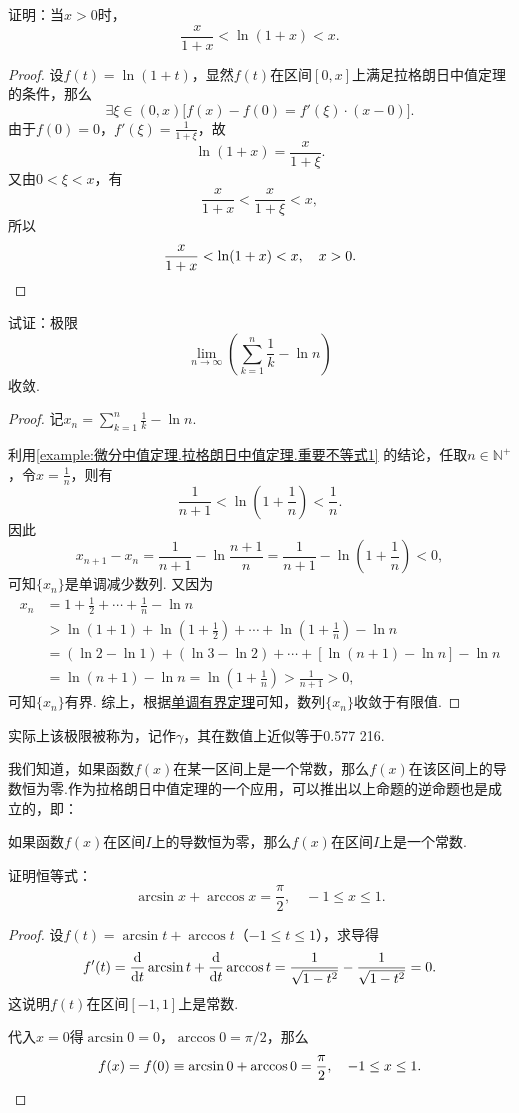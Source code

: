\begin{example}\label{example:微分中值定理.拉格朗日中值定理.重要不等式1}
证明：当\(x>0\)时，\[
\frac{x}{1+x} < \ln(1+x) < x.
\]
\begin{proof}
设\(f(t) = \ln(1+t)\)，显然\(f(t)\)在区间\([0,x]\)上满足拉格朗日中值定理的条件，那么\[
\exists \xi\in(0,x) \bigl[
	f(x)-f(0)=f'(\xi)\cdot(x-0)
\bigr].
\]由于\(f(0)=0\)，\(f'(\xi)=\frac{1}{1+\xi}\)，故\[
\ln(1+x) = \frac{x}{1+\xi}.
\]又由\(0<\xi<x\)，有\[
\frac{x}{1+x}<\frac{x}{1+\xi}<x,
\]所以\[
\frac{x}{1+x}<\ln(1+x)<x, \quad x > 0.
\qedhere
\]
\end{proof}
\end{example}

\begin{example}
试证：极限\[
\lim\limits_{n\to\infty} \left(\sum\limits_{k=1}^n \frac{1}{k} - \ln n\right)
\]收敛.
\begin{proof}
记\(x_n = \sum\limits_{k=1}^n \frac{1}{k} - \ln n\).

利用\cref{example:微分中值定理.拉格朗日中值定理.重要不等式1} 的结论，任取\(n\in\mathbb{N}^+\)，令\(x=\frac{1}{n}\)，则有\[
\frac{1}{n+1} < \ln(1+\frac{1}{n}) < \frac{1}{n}.
\]因此\[
x_{n+1} - x_n = \frac{1}{n+1} - \ln\frac{n+1}{n}
= \frac{1}{n+1} - \ln(1+\frac{1}{n}) < 0,
\]可知\(\{x_n\}\)是单调减少数列.
又因为\begin{align*}
x_n &= 1 + \frac{1}{2} + \dotsb + \frac{1}{n} - \ln n \\
&> \ln(1+1) + \ln(1+\frac{1}{2}) + \dotsb + \ln(1+\frac{1}{n}) - \ln n \\
&= (\ln2-\ln1)+(\ln3-\ln2)+\dotsb+[\ln(n+1)-\ln n] - \ln n \\
&= \ln(n+1) - \ln n
= \ln(1+\frac{1}{n})
> \frac{1}{n+1} > 0,
\end{align*}
可知\(\{x_n\}\)有界.
综上，根据\hyperref[theorem:极限.函数的单调有界定理]{单调有界定理}可知，数列\(\{x_n\}\)收敛于有限值.
\end{proof}
实际上该极限被称为，记作\(\gamma\)，其在数值上近似等于0.577 216.
\end{example}

我们知道，如果函数\(f(x)\)在某一区间上是一个常数，那么\(f(x)\)在该区间上的导数恒为零.作为拉格朗日中值定理的一个应用，可以推出以上命题的逆命题也是成立的，即：
\begin{theorem}
如果函数\(f(x)\)在区间\(I\)上的导数恒为零，那么\(f(x)\)在区间\(I\)上是一个常数.
\end{theorem}

\begin{example}
证明恒等式：\[
\arcsin x + \arccos x = \frac{\pi}{2},
\quad -1 \leq x \leq 1.
\]
\begin{proof}
设\(f(t) = \arcsin t + \arccos t\)（\(-1 \leq t \leq 1\)），求导得\[
f'(t) = \dv{t} \arcsin t + \dv{t} \arccos t
= \frac{1}{\sqrt{1-t^2}} - \frac{1}{\sqrt{1-t^2}} = 0.
\]这说明\(f(t)\)在区间\([-1,1]\)上是常数.

代入\(x=0\)得\(\arcsin 0 = 0\)，\(\arccos 0 = \pi/2\)，那么\[
f(x) = f(0) \equiv \arcsin 0 + \arccos 0 = \frac{\pi}{2},
\quad -1 \leq x \leq 1.
\qedhere
\]
\end{proof}
\end{example}

